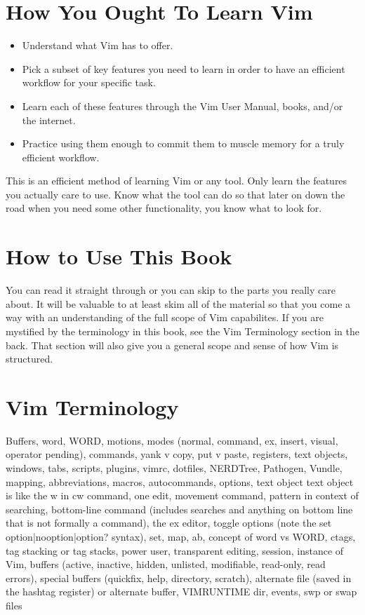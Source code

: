 \documentclass[12pt]{book}
\begin{document}
\section{How You Ought To Learn Vim}
\begin{itemize}
\item Understand what Vim has to offer.
\item Pick a subset of key features you need to learn in order to have an efficient workflow for your specific task.
\item Learn each of these features through the Vim User Manual, books, and/or the internet.
\item Practice using them enough to commit them to muscle memory for a truly efficient workflow.
\end{itemize}
This is an efficient method of learning Vim or any tool.
Only learn the features you actually care to use.
Know what the tool can do so that later on down the road when you need some other functionality, you know what to look for.

\section{How to Use This Book}
You can read it straight through or you can skip to the parts you really care about.
It will be valuable to at least skim all of the material so that you come a way with an understanding of the full scope of Vim capabilites.
If you are mystified by the terminology in this book, see the Vim Terminology section in the back.
That section will also give you a general scope and sense of how Vim is structured.

\section{Vim Terminology}
Buffers, word, WORD, motions, modes (normal, command, ex, insert, visual, operator pending), commands, yank v copy, put v paste, registers, text objects, windows, tabs, scripts, plugins, vimrc, dotfiles,
NERDTree, Pathogen, Vundle, mapping, abbreviations, macros, autocommands, options, text object text object is like the w in cw command, one edit, movement command, pattern in context of
searching, bottom-line command (includes searches and anything on bottom line that is not formally a command), the ex editor, toggle options (note the set option|nooption|option? syntax),
set, map, ab, concept of word vs WORD, ctags, tag stacking or tag stacks, power user, transparent editing, session, instance of Vim, buffers (active, inactive, hidden, unlisted, modifiable, read-only,
read errors), special buffers (quickfix, help, directory, scratch), alternate file (saved in the hashtag register) or alternate buffer, VIMRUNTIME dir, events, swp or swap files
\end{document}
